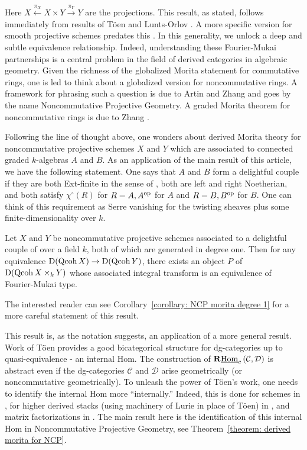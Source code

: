 Here \(X \overset{\pi_X}\longleftarrow X \times Y \overset{\pi_Y}\longrightarrow Y\) are the projections. This result, as stated, follows immediately from results of T\"oen and Lunts-Orlov \parencite{Toen07,Lunts-Orlov}. A more specific version for smooth projective schemes predates this \parencite{Orlov97}. In this generality, we unlock a deep and subtle equivalence relationship. Indeed, understanding these Fourier-Mukai partnerships is a central problem in the field of derived categories in algebraic geometry. 
Given the richness of the globalized Morita statement for commutative rings, one is led to think about a globalized version for noncommutative rings. A framework for phrasing such a question is due to Artin and Zhang \parencite{AZ94} and goes by the name Noncommutative Projective Geometry. A graded Morita theorem for noncommutative rings is due to Zhang \parencite{Zhang96}.  


Following the line of thought above, one wonders about derived Morita theory for noncommutative projective schemes \(X\) and \(Y\) which are associated to connected graded \(k\)-algebras \(A\) and \(B\).
As an application of the main result of this article, we have the following statement. One says that \(A\) and \(B\) form a delightful couple if they are both Ext-finite in the sense of \parencite{VdB}, both are left and right Noetherian, and both satisfy \(\chi^\circ(R)\) for \(R=A,A^{\operatorname{op}}\) for \(A\) and \(R = B, B^{\operatorname{op}}\) for \(B\). One can think of this requirement as Serre vanishing for the twisting sheaves plus some finite-dimensionality over \(k\).

\begin{theorem}
  Let \(X\) and \(Y\) be noncommutative projective schemes associated to a delightful couple of over a field \(k\), both of which are generated in degree one.
  Then for any equivalence \(\mathrm{D}(\operatorname{Qcoh}X) \to \mathrm{D}(\operatorname{Qcoh}Y)\), there exists an object \(P\) of \(\mathrm{D}(\operatorname{Qcoh}X \times_k Y)\) whose associated integral transform is an equivalence of Fourier-Mukai type.
\end{theorem}

\noindent
The interested reader can see Corollary~\ref{corollary: NCP morita degree 1} for a more careful statement of this result.

This result is, as the notation suggests, an application of a more general result. Work of T\"oen provides a good bicategorical structure for dg-categories up to quasi-equivalence \parencite{Toen07} - an internal Hom. The construction of \(\mathbf{R}\underline{\operatorname{Hom}}_c\left(\mathcal C, \mathcal D\right)\) is abstract even if the dg-categories \(\mathcal C\) and \(\mathcal D\) arise geometrically (or noncommutative geometrically). To unleash the power of T\"oen's work, one needs to identify the internal Hom more ``internally.'' Indeed, this is done for schemes in \parencite{Toen07}, for higher derived stacks (using machinery of Lurie in place of T\"oen) in \parencite{BFN10}, and matrix factorizations in \parencite{Dyckerhoff11,PV12,BFK14}. The main result here is the identification of this internal Hom in Noncommutative Projective Geometry, see Theorem~\ref{theorem: derived morita for NCP}. 


